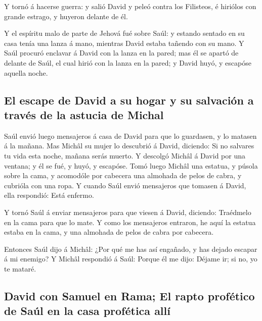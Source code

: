  Y tornó á hacerse guerra: y salió David y peleó contra
los Filisteos, é hiriólos con grande estrago, y huyeron delante de él.

 Y el espíritu malo de parte de Jehová fué sobre Saúl: y
estando sentado en su casa tenía una lanza á mano, mientras David estaba
tañendo con su mano.  Y Saúl procuró enclavar á David con
la lanza en la pared; mas él se apartó de delante de Saúl, el cual hirió
con la lanza en la pared; y David huyó, y escapóse aquella noche.

\hypertarget{el-escape-de-david-a-su-hogar-y-su-salvaciuxf3n-a-travuxe9s-de-la-astucia-de-michal}{%
\subsection{El escape de David a su hogar y su salvación a través de la
astucia de
Michal}\label{el-escape-de-david-a-su-hogar-y-su-salvaciuxf3n-a-travuxe9s-de-la-astucia-de-michal}}

 Saúl envió luego mensajeros á casa de David para que lo
guardasen, y lo matasen á la mañana. Mas Michâl su mujer lo descubrió á
David, diciendo: Si no salvares tu vida esta noche, mañana serás muerto.
 Y descolgó Michâl á David por una ventana; y él se fué,
y huyó, y escapóse.  Tomó luego Michâl una estatua, y
púsola sobre la cama, y acomodóle por cabecera una almohada de pelos de
cabra, y cubrióla con una ropa.  Y cuando Saúl envió
mensajeros que tomasen á David, ella respondió: Está enfermo.

 Y tornó Saúl á enviar mensajeros para que viesen á
David, diciendo: Traédmelo en la cama para que lo mate. 
Y como los mensajeros entraron, he aquí la estatua estaba en la cama, y
una almohada de pelos de cabra por cabecera.

 Entonces Saúl dijo á Michâl: ¿Por qué me has así
engañado, y has dejado escapar á mi enemigo? Y Michâl respondió á Saúl:
Porque él me dijo: Déjame ir; si no, yo te mataré.

\hypertarget{david-con-samuel-en-rama-el-rapto-profuxe9tico-de-sauxfal-en-la-casa-profuxe9tica-alluxed}{%
\subsection{David con Samuel en Rama; El rapto profético de Saúl en la
casa profética
allí}\label{david-con-samuel-en-rama-el-rapto-profuxe9tico-de-sauxfal-en-la-casa-profuxe9tica-alluxed}}

